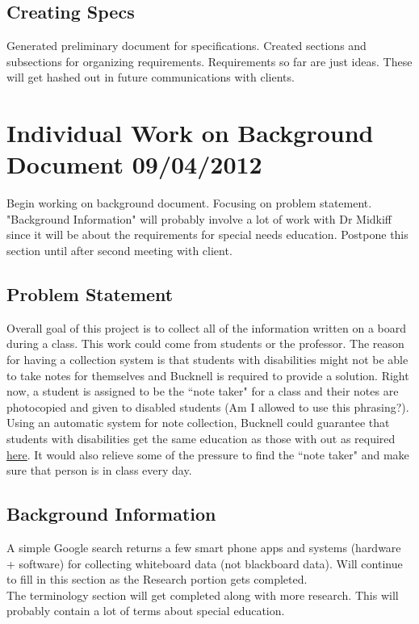 \documentclass[]{article}
\begin{document}
		\subsection{Creating Specs}
			Generated preliminary document for specifications. Created sections and subsections for organizing requirements. Requirements so far are just ideas. These will get hashed out in future communications with clients. 
			
	
	\section{Individual Work on Background Document 09/04/2012}
		Begin working on background document. Focusing on problem statement. "Background Information" will probably involve a lot of work with Dr Midkiff since it will be about the requirements for special needs education. Postpone this section until after second meeting with client. 
		
		\subsection{Problem Statement}
			Overall goal of this project is to collect all of the information written on a board during a class. This work could come from students or the professor. The reason for having a collection system is that students with disabilities might not be able to take notes for themselves and Bucknell is required to provide a solution. Right now, a student is assigned to be the ``note taker" for a class and their notes are photocopied and given to disabled students (Am I allowed to use this phrasing?). Using an automatic system for note collection, Bucknell could guarantee that students with disabilities get the same education as those with out as required \href{http://en.wikipedia.org/wiki/Individuals_with_Disabilities_Education_Act#Least_Restrictive_Environment}{here}. It would also relieve some of the pressure to find the ``note taker" and make sure that person is in class every day. \\
			
		\subsection{Background Information}
			A simple Google search returns a few smart phone apps and systems (hardware + software) for collecting whiteboard data (not blackboard data). Will continue to fill in this section as the Research portion gets completed. \\
			The terminology section will get completed along with more research. This will probably contain a lot of terms about special education.
			
\end{document}
